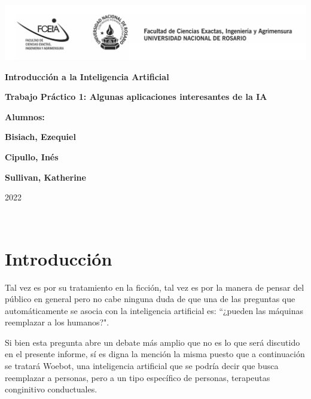\documentclass[11pt]{article}
\begin{document}
\begin{titlepage}
    \hspace{-2.5cm}\includegraphics[scale= 0.48]{header.png}
    \begin{center}
        \vfill
            \noindent\textbf{\Huge Introducción a la Inteligencia Artificial}\par
            \vspace{.5cm}
            \noindent\textbf{\Huge Trabajo Práctico 1: Algunas aplicaciones interesantes de la IA}\par
            \vspace{.5cm}
        \vfill
        \noindent \textbf{\huge Alumnos:}\par
        \vspace{.5cm}
        \noindent \textbf{\Large Bisiach, Ezequiel}\par
        \noindent \textbf{\Large Cipullo, Inés}\par
        \noindent \textbf{\Large Sullivan, Katherine}\par
 
        \vfill
        \noindent\large 2022
    \end{center}
\end{titlepage}
\ \par


\section{Introducción}
Tal vez es por su tratamiento en la ficción, tal vez es 
por la manera de pensar del público en general pero no
cabe ninguna duda de que una de las preguntas que 
automáticamente se asocia con la inteligencia artificial
es: ``¿pueden las máquinas reemplazar a los humanos?". 

Si 
bien esta pregunta abre un debate más amplio que no es lo 
que será discutido en el presente informe, sí es digna la
mención la misma puesto que a continuación se tratará
Woebot, una inteligencia artificial que se podría decir
que busca reemplazar
a personas, pero a un tipo específico de personas, 
terapeutas conginitivo conductuales. 
\end{document}
